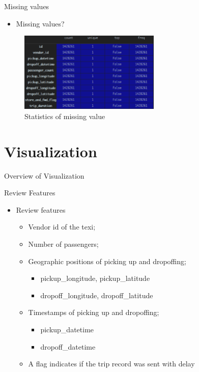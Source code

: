 \documentclass[
 size=12pt,
 paper=smartboard, %
 mode=present, %
 display=slides, %
style=tuliplab,
pauseslide,
fleqn,leqno]{powerdot}
\begin{document}
\begin{slide}{Missing values}
  \begin{itemize}
    \item Missing values?
  \end{itemize}
  \pause
  \begin{figure}[h]
    \centering
    \includegraphics[width=0.6\textwidth]{figures2/train_null.eps}
    \caption{Statistics of missing value}
    \label{fig:missing-value-pic}
  \end{figure}
\end{slide}


\section{Visualization}

\begin{slide}[toc=,bm=]{Overview of Visualization}
  \tableofcontents[content=currentsection,type=0]
\end{slide}

\begin{slide}{Review Features}
  \begin{itemize}
    \item Review features \pause
    \begin{itemize}
      \item Vendor id of the texi; \pause
      \item Number of passengers; \pause
      \item Geographic positions of picking up and dropoffing; \pause
      \begin{itemize}
        \item pickup_longitude, pickup_latitude
        \item dropoff_longitude, dropoff_latitude
      \end{itemize} \pause
      \item Timestamps of picking up and dropoffing; \pause
      \begin{itemize}
        \item pickup_datetime
        \item dropoff_datetime
      \end{itemize} \pause
      \item A flag indicates if the trip record was sent with delay
    \end{itemize}
  \end{itemize}
\end{slide}
\end{document}
